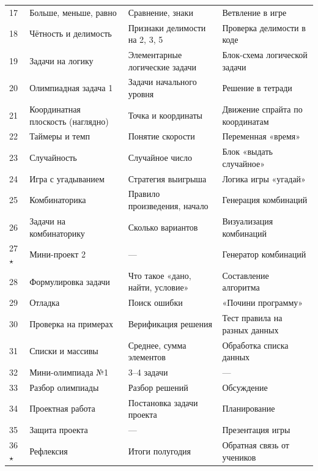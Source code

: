\documentclass[12pt,a4paper]{article}
\begin{document}
\begin{longtable}{C{1.0cm}L{4.4cm}L{4.0cm}L{4.4cm}}
17 & Больше, меньше, равно & Сравнение, знаки & Ветвление в игре\\
18 & Чётность и делимость & Признаки делимости на 2, 3, 5 & Проверка делимости в коде\\
19 & Задачи на логику & Элементарные логические задачи & Блок-схема логической задачи\\
20 & Олимпиадная задача 1 & Задачи начального уровня & Решение в тетради\\
21 & Координатная плоскость (наглядно) & Точка и координаты & Движение спрайта по координатам\\
22 & Таймеры и темп & Понятие скорости & Переменная «время»\\
23 & Случайность & Случайное число & Блок «выдать случайное»\\
24 & Игра с угадыванием & Стратегия выигрыша & Логика игры «угадай»\\
25 & Комбинаторика & Правило произведения, начало & Генерация комбинаций\\
26 & Задачи на комбинаторику & Сколько вариантов & Визуализация комбинаций\\
27 $\star$ & Мини-проект 2 & --- & Генератор комбинаций\\
28 & Формулировка задачи & Что такое «дано, найти, условие» & Составление алгоритма\\
29 & Отладка & Поиск ошибки & «Почини программу»\\
30 & Проверка на примерах & Верификация решения & Тест правила на разных данных\\
31 & Списки и массивы & Среднее, сумма элементов & Обработка списка данных\\
32 & Мини-олимпиада №1 & 3--4 задачи & ---\\
33 & Разбор олимпиады & Разбор решений & Обсуждение\\
34 & Проектная работа & Постановка задачи проекта & Планирование\\
35 & Защита проекта & --- & Презентация игры\\
36 $\star$ & Рефлексия & Итоги полугодия & Обратная связь от учеников\\
\midrule


\end{longtable}
\end{document}
